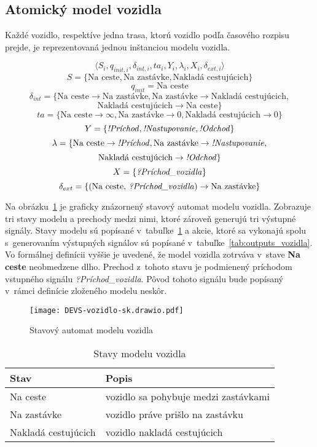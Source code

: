 \newpage
\subsection*{Atomický model vozidla}\label{model_vozidla}

Každé vozidlo, respektíve jedna trasa, ktorú vozidlo podľa časového rozpisu prejde, je reprezentovaná jednou inštanciou modelu vozidla.

\[\langle S_i, q_{init,i}, {\delta}_{int,i}, ta_i, Y_i, {\lambda}_i, X_i, {\delta}_{ext,i} \rangle\]
\[S = \{\text{Na ceste}, \text{Na zastávke}, \text{Nakladá cestujúcich} \}\]
\[q_{init} = \text{Na ceste}\]
\[\delta_{int} = \{ \text{Na ceste} \rightarrow \text{Na zastávke}, \text{Na zastávke} \rightarrow \text{Nakladá cestujúcich},\]
\[\text{Nakladá cestujúcich} \rightarrow \text{Na ceste} \}\]
\[ta = \{ \text{Na ceste} \rightarrow \infty, \text{Na zastávke} \rightarrow 0, \text{Nakladá cestujúcich} \rightarrow 0 \}\]
\[Y = \{\text{\textit{!Príchod}}, \text{\textit{!Nastupovanie}}, \text{\textit{!Odchod}} \}\]
\[\lambda = \{ \text{Na ceste} \rightarrow \text{\textit{!Príchod}}, \text{Na zastávke} \rightarrow \text{\textit{!Nastupovanie}},\]
\[\text{Nakladá cestujúcich} \rightarrow \text{\textit{!Odchod}} \}\]
\[X = \{ \text{\textit{?Príchod\_vozidla}} \}\]
\[\delta_{ext} = \{ (\text{Na ceste, \textit{?Príchod\_vozidla}}) \rightarrow \text{Na zastávke} \}\]

Na obrázku~\ref{fig:model_vozidla} je graficky znázornený stavový automat modelu vozidla.
Zobrazuje tri stavy modelu a prechody medzi nimi, ktoré zároveň generujú tri výstupné signály.
Stavy modelu sú popísané v~tabuľke~\ref{tab:stavy_vozidla} a akcie, ktoré sa vykonajú spolu s~generovaním výstupných signálov sú popísané v~tabuľke~\ref{tab:outputs_vozidla}.
Vo formálnej definícii vyššie je uvedené, že model vozidla zotrváva v~stave \textbf{Na ceste} neobmedzene dlho.
Prechod z~tohoto stavu je podmienený príchodom vstupného signálu \textit{?Príchod\_vozidla}.
Pôvod tohoto signálu bude popísaný v~rámci definície zloženého modelu neskôr.

\begin{figure}[h]\label{fig:model_vozidla}
  \centering
  \texttt{[image: DEVS-vozidlo-sk.drawio.pdf]}
  \caption{Stavový automat modelu vozidla}
\end{figure}

\begin{table}[h]\label{tab:stavy_vozidla}
  \centering
  \begin{tabularx}{\textwidth}{|l|X|}
    \hline
    \textbf{Stav} & \textbf{Popis} \\ \hline
    Na ceste & vozidlo sa pohybuje medzi zastávkami \\ \hline
    Na zastávke & vozidlo práve prišlo na zastávku \\ \hline
    Nakladá cestujúcich & vozidlo nakladá cestujúcich \\ \hline %
  \end{tabularx}
  \caption{Stavy modelu vozidla}
\end{table}

